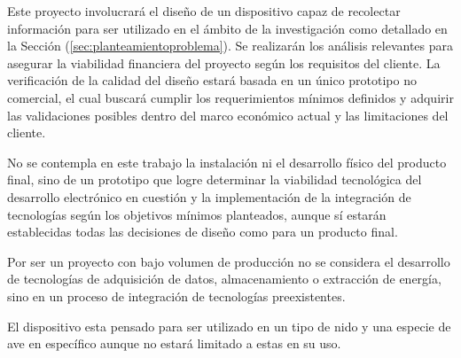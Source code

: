 Este proyecto involucrará el diseño de un dispositivo capaz de recolectar información para ser utilizado en el ámbito de la investigación como detallado en la Sección (\ref{sec:planteamientoproblema}). Se realizarán los análisis relevantes para asegurar la viabilidad financiera del proyecto según los requisitos del cliente. La verificación de la calidad del diseño estará basada en un único prototipo no comercial, el cual buscará cumplir los requerimientos mínimos definidos y adquirir las validaciones posibles dentro del marco económico actual y las limitaciones del cliente. 

No se contempla en este trabajo la instalación ni el desarrollo físico del producto final, sino de un prototipo que logre determinar la viabilidad tecnológica del desarrollo electrónico en cuestión y la implementación de la integración de tecnologías según los objetivos mínimos planteados, aunque sí estarán establecidas todas las decisiones de diseño como para un producto final. 

Por ser un proyecto con bajo volumen de producción no se considera el desarrollo de tecnologías de adquisición de datos, almacenamiento o extracción de energía, sino en un proceso de integración de tecnologías preexistentes.

El dispositivo esta pensado para ser utilizado en un tipo de nido y una especie de ave en específico aunque no estará limitado a estas en su uso.